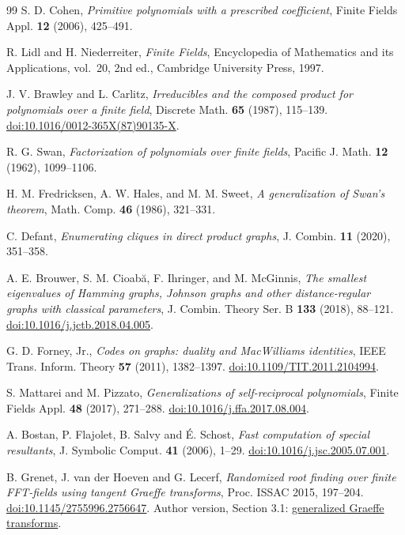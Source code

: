 \documentclass[11pt]{article}
\theoremstyle{definition}
\theoremstyle{remark}
\begin{document}
\begin{thebibliography}{99}
\small
\setlength{\itemsep}{1.5pt}
\setlength{\parsep}{0pt}
\setlength{\parskip}{0pt}
S. D. Cohen,
\emph{Primitive polynomials with a prescribed coefficient},
Finite Fields Appl. \textbf{12} (2006), 425--491.

R. Lidl and H. Niederreiter,
\emph{Finite Fields},
Encyclopedia of Mathematics and its Applications, vol.~20, 2nd ed., Cambridge University Press, 1997.

J. V. Brawley and L. Carlitz,
\emph{Irreducibles and the composed product for polynomials over a finite field},
Discrete Math. \textbf{65} (1987), 115--139.
\href{https://doi.org/10.1016/0012-365X(87)90135-X}{doi:10.1016/0012-365X(87)90135-X}.

R. G. Swan,
\emph{Factorization of polynomials over finite fields},
Pacific J. Math. \textbf{12} (1962), 1099--1106.

H. M. Fredricksen, A. W. Hales, and M. M. Sweet,
\emph{A generalization of Swan's theorem},
Math. Comp. \textbf{46} (1986), 321--331.

C. Defant,
\emph{Enumerating cliques in direct product graphs},
J. Combin. \textbf{11} (2020), 351--358.

A. E. Brouwer, S. M. Cioab\u{a}, F. Ihringer, and M. McGinnis,
\emph{The smallest eigenvalues of Hamming graphs, Johnson graphs and
other distance-regular graphs with classical parameters},
J. Combin. Theory Ser. B \textbf{133} (2018), 88--121.
\href{https://doi.org/10.1016/j.jctb.2018.04.005}{doi:10.1016/j.jctb.2018.04.005}.

G. D. Forney, Jr.,
\emph{Codes on graphs: duality and MacWilliams identities},
IEEE Trans. Inform. Theory \textbf{57} (2011), 1382--1397.
\href{https://doi.org/10.1109/TIT.2011.2104994}{doi:10.1109/TIT.2011.2104994}.

S. Mattarei and M. Pizzato,
\emph{Generalizations of self-reciprocal polynomials},
Finite Fields Appl. \textbf{48} (2017), 271--288.
\href{https://doi.org/10.1016/j.ffa.2017.08.004}{doi:10.1016/j.ffa.2017.08.004}.

A. Bostan, P. Flajolet, B. Salvy and \'E. Schost,
\emph{Fast computation of special resultants},
J. Symbolic Comput. \textbf{41} (2006), 1--29.
\href{https://doi.org/10.1016/j.jsc.2005.07.001}{doi:10.1016/j.jsc.2005.07.001}.

B. Grenet, J. van der Hoeven and G. Lecerf,
\emph{Randomized root finding over finite FFT-fields using tangent Graeffe transforms},
Proc. ISSAC 2015, 197--204.
\href{https://doi.org/10.1145/2755996.2756647}{doi:10.1145/2755996.2756647}.
Author version, Section 3.1:
\href{https://www.texmacs.org/joris/rmodroots/rmodroots.html}{generalized Graeffe transforms}.


\end{thebibliography}
\end{document}

